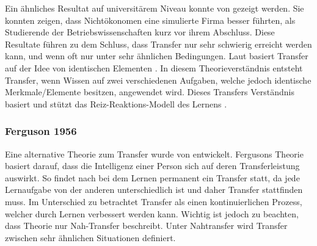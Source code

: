 Ein ähnliches Resultat auf universitärem Niveau konnte von \citet{Renkl1994} gezeigt werden. Sie konnten zeigen, dass Nichtökonomen eine simulierte Firma besser führten, als Studierende der Betriebswissenschaften kurz vor ihrem Abschluss. Diese Resultate führen zu dem Schluss, dass Transfer nur sehr schwierig erreicht werden kann, und wenn oft nur unter sehr ähnlichen Bedingungen. Laut \citet{Woodworth1901} basiert Transfer auf der Idee von identischen Elementen \citep{Pea2013b}. In diesem Theorieverständnis entsteht Transfer, wenn Wissen auf zwei verschiedenen Aufgaben, welche jedoch identische Merkmale/Elemente besitzen, angewendet wird. Dieses Transfers Verständnis basiert und stützt das Reiz-Reaktions-Modell des Lernens \citep{Detterman1993, Mietzel2007}.


\subsubsection{Ferguson 1956}
Eine alternative Theorie zum Transfer wurde von \citet{Ferguson1956} entwickelt. Fergusons Theorie basiert darauf, dass die Intelligenz einer Person sich auf deren Transferleistung auswirkt. So findet nach \citet{Ferguson1956} bei dem Lernen permanent ein Transfer statt, da jede Lernaufgabe von der anderen unterschiedlich ist und daher Transfer stattfinden muss. Im Unterschied zu \citet{Woodworth1901} betrachtet \citeauthor{Ferguson1956} Transfer als einen kontinuierlichen Prozess, welcher durch Lernen verbessert werden kann. Wichtig ist jedoch zu beachten, dass \citeauthor{Ferguson1956} Theorie nur Nah-Transfer beschreibt. Unter Nahtransfer wird Transfer zwischen sehr ähnlichen Situationen definiert. 


